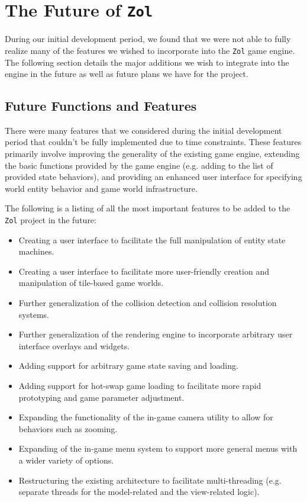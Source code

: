 \documentclass{article}
\newcommand{\projectname}[0] {\texttt{Zol} }
\begin{document}
	\section[Future Plans]{The Future of \projectname}
	During our initial development period, we found that we were not able to
	fully realize many of the features we wished to incorporate into the
	\projectname game engine.  The following section details the major additions
	we wish to integrate into the engine in the future as well as future plans
	we have for the project.

		\subsection[Features]{Future Functions and Features}
		There were many features that we considered during the initial development
		period that couldn't be fully implemented due to time constraints.  These
		features primarily involve improving the generality of the existing game
		engine, extending the basic functions provided by the game engine (e.g.
		adding to the list of provided state behaviors), and providing an enhanced
		user interface for specifying world entity behavior and game world
		infrastructure.

		The following is a listing of all the most important features to be added
		to the \projectname project in the future:

		\begin{itemize}
			\item Creating a user interface to facilitate the full manipulation
			of entity state machines.

			\item Creating a user interface to facilitate more user-friendly
			creation and manipulation of tile-based game worlds.

			\item Further generalization of the collision detection and collision
			resolution systems.

			\item Further generalization of the rendering engine to incorporate
			arbitrary user interface overlays and widgets.

			\item Adding support for arbitrary game state saving and loading.

			\item Adding support for hot-swap game loading to facilitate more
			rapid prototyping and game parameter adjustment.

			\item Expanding the functionality of the in-game camera utility to
			allow for behaviors such as zooming.

			\item Expanding of the in-game menu system to support more general
			menus with a wider variety of options.

			\item Restructuring the existing architecture to facilitate
			multi-threading (e.g. separate threads for the model-related and
			the view-related logic).
		\end{itemize}
\end{document}

